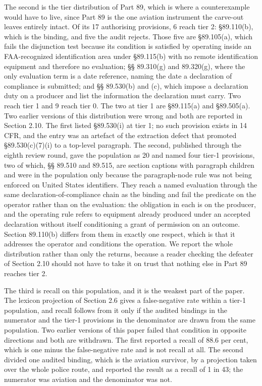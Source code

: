 The second is the tier distribution of Part 89, which is where a counterexample would have to live, since Part 89 is the one aviation instrument the carve-out leaves entirely intact. Of its 17 authorising provisions, 6 reach tier 2: \S{}89.110(b), which is the binding, and five the audit rejects. Those five are \S{}89.105(a), which fails the disjunction test because its condition is satisfied by operating inside an FAA-recognized identification area under \S{}89.115(b) with no remote identification equipment and therefore no evaluation; \S{}\S{} 89.310(g) and 89.320(g), where the only evaluation term is a date reference, naming the date a declaration of compliance is submitted; and \S{}\S{} 89.530(b) and (c), which impose a declaration duty on a producer and list the information the declaration must carry. Two reach tier 1 and 9 reach tier 0. The two at tier 1 are \S{}89.115(a) and \S{}89.505(a). Two earlier versions of this distribution were wrong and both are reported in Section 2.10. The first listed \S{}89.530(i) at tier 1; no such provision exists in 14 CFR, and the entry was an artefact of the extraction defect that promoted \S{}89.530(c)(7)(i) to a top-level paragraph. The second, published through the eighth review round, gave the population as 20 and named four tier-1 provisions, two of which, \S{}\S{} 89.510 and 89.515, are section captions with paragraph children and were in the population only because the paragraph-node rule was not being enforced on United States identifiers. They reach a named evaluation through the same declaration-of-compliance chain as the binding and fail the predicate on the operator rather than on the evaluation: the obligation in each is on the producer, and the operating rule refers to equipment already produced under an accepted declaration without itself conditioning a grant of permission on an outcome. Section 89.110(b) differs from them in exactly one respect, which is that it addresses the operator and conditions the operation. We report the whole distribution rather than only the returns, because a reader checking the defeater of Section 2.10 should not have to take it on trust that nothing else in Part 89 reaches tier 2.

The third is recall on this population, and it is the weakest part of the paper. The lexicon projection of Section 2.6 gives a false-negative rate within a tier-1 population, and recall follows from it only if the audited bindings in the numerator and the tier-1 provisions in the denominator are drawn from the same population. Two earlier versions of this paper failed that condition in opposite directions and both are withdrawn. The first reported a recall of 88.6 per cent, which is one minus the false-negative rate and is not recall at all. The second divided one audited binding, which is the aviation survivor, by a projection taken over the whole police route, and reported the result as a recall of 1 in 43; the numerator was aviation and the denominator was not.

